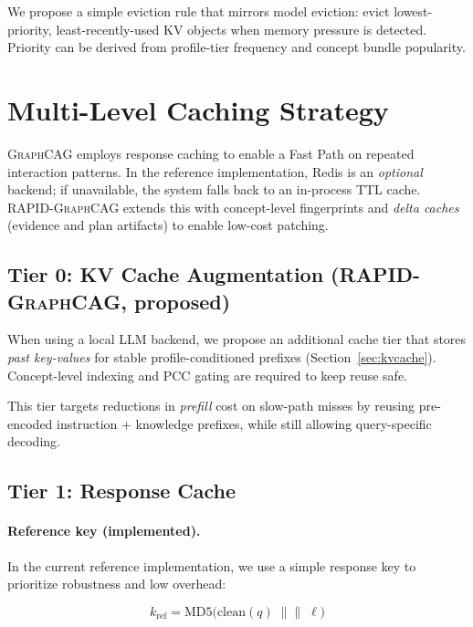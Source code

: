\documentclass[11pt,a4paper,twocolumn]{article}
\newcommand{\graphcag}{\textsc{GraphCAG}}
\newcommand{\rapid}{\textsc{RAPID-GraphCAG}}
\begin{document}
We propose a simple eviction rule that mirrors model eviction: evict lowest-priority, least-recently-used KV objects when memory pressure is detected. Priority can be derived from profile-tier frequency and concept bundle popularity.

\section{Multi-Level Caching Strategy}
\label{sec:caching}

\graphcag{} employs response caching to enable a Fast Path on repeated interaction patterns. In the reference implementation, Redis is an \emph{optional} backend; if unavailable, the system falls back to an in-process TTL cache. \rapid{} extends this with concept-level fingerprints and \emph{delta caches} (evidence and plan artifacts) to enable low-cost patching.

\subsection{Tier 0: KV Cache Augmentation (\rapid{}, proposed)}

When using a local LLM backend, we propose an additional cache tier that stores \emph{past key-values} for stable profile-conditioned prefixes (Section~\ref{sec:kvcache}). Concept-level indexing and PCC gating are required to keep reuse safe.

This tier targets reductions in \emph{prefill} cost on slow-path misses by reusing pre-encoded instruction + knowledge prefixes, while still allowing query-specific decoding.

\subsection{Tier 1: Response Cache}

\paragraph{Reference key (implemented).} In the current reference implementation, we use a simple response key to prioritize robustness and low overhead:

\begin{equation}
\label{eq:cache_key_ref}
k_{\text{ref}} = \text{MD5}\big(\text{clean}(q) \;\|\|\; \ell\big)
\end{equation}
\end{document}
